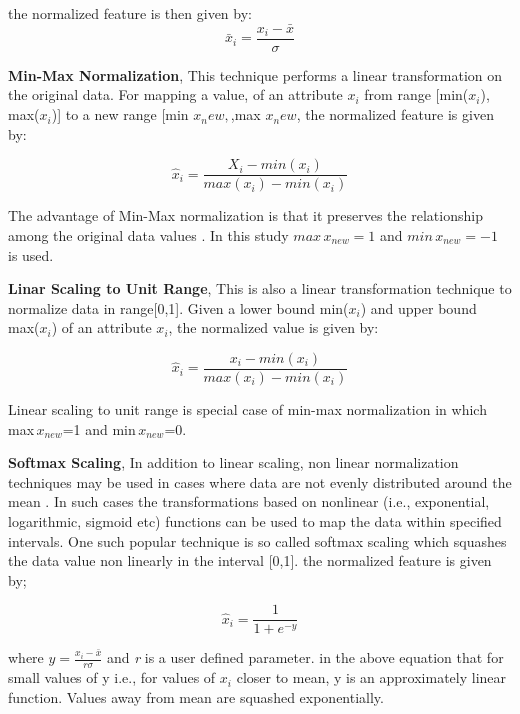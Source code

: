the normalized feature is then given by:
\begin{equation}
\bar{x}_i=\frac{x_i-\bar{x}}{\sigma}
\end{equation}

\textbf{Min-Max Normalization}, This technique performs a linear transformation on the original data. For mapping a value, of an attribute \(x_i\) from range [min(\(x_i\)), max(\(x_i\))] to a new range [min \(x_new,\),max \(x_new\), the normalized feature is given by:

\begin{equation}
\hat{x}_i=\frac{X_i-min(x_i)}{max(x_i)-min(x_i)}
\end{equation}

The advantage of Min-Max normalization is that it preserves the relationship among the original data values \cite{manikandan2013achieving}. In this study \(max\,x_{new}=1\) and \(min\,x_{new}=-1\) is used.

\textbf{Linar Scaling to Unit Range}, This is also a linear transformation technique to normalize data in range[0,1]. Given a lower bound min(\(x_i\)) and upper bound max(\(x_i\)) of an attribute \(x_i\), the normalized value is given by:

\begin{equation}
\hat{x}_i=\frac{x_i-min(x_i)}{max(x_i)-min(x_i)}
\end{equation}

Linear scaling to unit range is special case of min-max normalization in which max\(\,x_{new}\)=1 and min\(\,x_{new}\)=0.

\textbf{Softmax Scaling}, In addition to linear scaling, non linear normalization techniques may be used in cases where data are not evenly distributed around the mean \cite{theodoridis2010introduction}. In such cases the transformations based on nonlinear (i.e., exponential, logarithmic, sigmoid etc) functions can be used to map the data within specified intervals. One such popular technique is so called softmax scaling which squashes the data value non linearly in the interval [0,1]. the normalized feature is given by;

\begin{equation}
\hat{x}_i=\frac{1}{1+e^{-y}}
\end{equation}

where \(y=\frac{x_i-\bar{x}}{r\sigma}\) and \textit{r} is a user defined parameter. in the above equation that for small values of y i.e., for values of \(x_i\) closer to mean, y is an approximately linear function. Values away from mean are squashed exponentially.